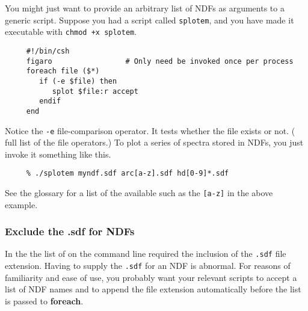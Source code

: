 You might just want to provide an arbitrary list of NDFs as arguments to
a generic script.  Suppose you had a script called {\tt splotem}, and
you have made it executable with \mbox{\tt chmod +x splotem}.

\small
\begin{verbatim}
     #!/bin/csh
     figaro                 # Only need be invoked once per process
     foreach file ($*) 
        if (-e $file) then
           splot $file:r accept
        endif
     end
\end{verbatim}
\normalsize

Notice the {\tt -e} file-comparison operator.  It tests whether the
file exists or not.  ( full list of
the file operators.) To plot a series of spectra stored in NDFs, you
just invoke it something like this.

\small
\begin{verbatim}
     % ./splotem myndf.sdf arc[a-z].sdf hd[0-9]*.sdf
\end{verbatim}
\normalsize

See the glossary for a list of the available
 such as the {\tt [a-z]} in the
above example.

\subsubsection{Exclude the .sdf for NDFs
\label{sc4_se_wildcard_nosdf}}

In the  the list of
 on the command line required the inclusion of
the {\tt .sdf} file extension.  Having to supply the {\tt .sdf} for an
NDF is abnormal.  For reasons of familiarity and ease of use, you
probably want your relevant scripts to accept a list of NDF names and
to append the file extension automatically before the list is passed to
{\bf foreach}.  

